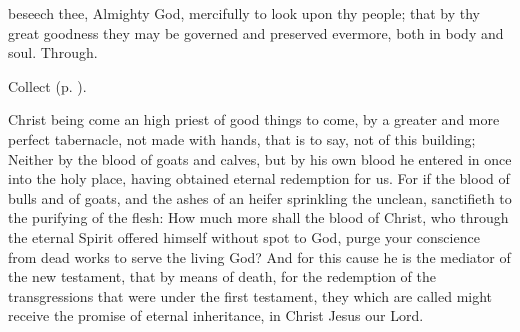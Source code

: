 \collect
{} beseech thee, Almighty God, mercifully to look upon thy people; that by thy great goodness they may be governed and preserved evermore, both in body and soul. Through.

\begin{rubric}
     Collect  (p. \pageref{AshWednesdayMassCollect}).
\end{rubric}

 Christ being come an high priest of good things to come, by a greater and more perfect tabernacle, not made with hands, that is to say, not of this building; Neither by the blood of goats and calves, but by his own blood he entered in once into the holy place, having obtained eternal redemption for us. For if the blood of bulls and of goats, and the ashes of an heifer sprinkling the unclean, sanctifieth to the purifying of the flesh: How much more shall the blood of Christ, who through the eternal Spirit offered himself without spot to God, purge your conscience from dead works to serve the living God? And for this cause he is the mediator of the new testament, that by means of death, for the redemption of the transgressions that were under the first testament, they which are called might receive the promise of eternal inheritance, in Christ Jesus our Lord.


